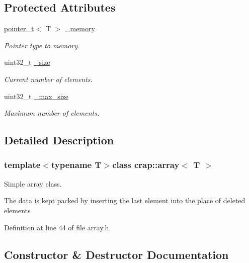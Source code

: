 \subsection*{Protected Attributes}
\begin{DoxyCompactItemize}
\item 
\hyperlink{structcrap_1_1pointer__t}{pointer\+\_\+t}$<$ T $>$ \hyperlink{classcrap_1_1array_a18129c001adcedf3644bf04e5cb6be25}{\+\_\+memory}
\begin{DoxyCompactList}\small\item\em Pointer type to memory. \end{DoxyCompactList}\item 
uint32\+\_\+t \hyperlink{classcrap_1_1array_aeebbf4b3828375ad799bb6f3638b5a3f}{\+\_\+size}
\begin{DoxyCompactList}\small\item\em Current number of elements. \end{DoxyCompactList}\item 
uint32\+\_\+t \hyperlink{classcrap_1_1array_a75c6d374d83be41d0726ae6ca82541fa}{\+\_\+max\+\_\+size}
\begin{DoxyCompactList}\small\item\em Maximum number of elements. \end{DoxyCompactList}\end{DoxyCompactItemize}


\subsection{Detailed Description}
\subsubsection*{template$<$typename T$>$class crap\+::array$<$ T $>$}

Simple array class. 

The data is kept packed by inserting the last element into the place of deleted elements 

Definition at line 44 of file array.\+h.



\subsection{Constructor \& Destructor Documentation}
\hypertarget{classcrap_1_1array_af72adceda49b018031c4fcc2cf62cfb5}{}
